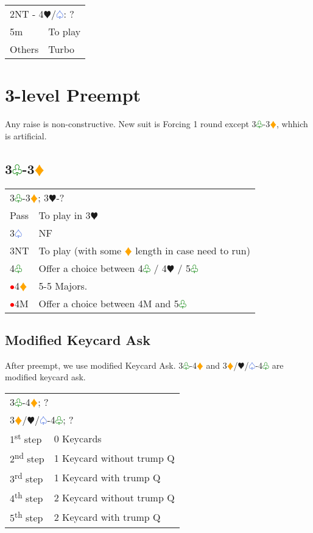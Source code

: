 \documentclass{article}
\renewcommand{\sp}{\textcolor{RoyalBlue}{$\varspade$}}
\newcommand{\he}{\textcolor{RubineRed}{$\varheart$}}
\newcommand{\di}{\textcolor{Orange}{$\vardiamond$}}
\newcommand{\cl}{\textcolor{Green}{$\varclub$}}
\newcommand{\nt}{\relsize{-1}NT\relsize{1}}
\newcommand{\al}{\textcolor{red}{$\bullet$}}
\begin{document}
\medskip

\begin{tabular}{|l|p{6.5cm}}
	\multicolumn{2}{l}{2\nt{} - 4\he/\sp{}: ?}\\
	5m & To play \\
	Others & Turbo \\
\end{tabular}

\section{3-level Preempt}
Any raise is non-constructive. New suit is Forcing 1 round except 3\cl{}-3\di{}, whhich is artificial.

\subsection{3\cl{}-3\di{}}

\begin{tabular}{|l|p{6.5cm}}
	\multicolumn{2}{l}{3\cl{}-3\di{}; 3\he{}-?}\\
	Pass & To play in 3\he{} \\
	3\sp{} & NF \\
	3\nt{} & To play (with some \di{} length in case need to run) \\
	4\cl{} & Offer a choice between 4\cl{} / 4\he{} / 5\cl{} \\
	\al{}4\di{} & 5-5 Majors. \\
	\al{}4M & Offer a choice between 4M and 5\cl{} \\
\end{tabular}

\subsection{Modified Keycard Ask}

After preempt, we use modified Keycard Ask. 3\cl{}-4\di{} and 3\di{}/\he{}/\sp{}-4\cl{} are modified keycard ask. \\

\begin{tabular}{|l|p{6.5cm}}
	\multicolumn{2}{l}{3\cl{}-4\di{}; ?} \\
	\multicolumn{2}{l}{3\di{}/\he{}/\sp{}-4\cl{}; ?}\\
	1\textsuperscript{st} step & 0 Keycards \\
	2\textsuperscript{nd} step & 1 Keycard without trump Q \\
	3\textsuperscript{rd} step & 1 Keycard with trump Q \\
	4\textsuperscript{th} step & 2 Keycard without trump Q \\
	5\textsuperscript{th} step & 2 Keycard with trump Q \\
\end{tabular}
\end{document}
